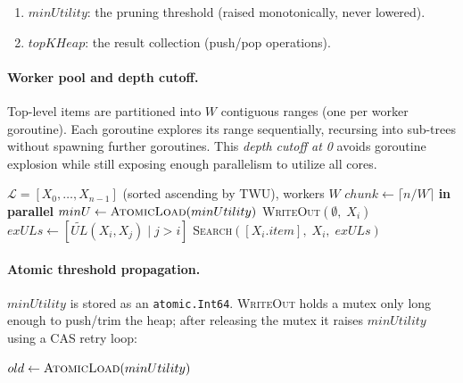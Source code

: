 \begin{enumerate}
  \item $minUtility$: the pruning threshold (raised monotonically, never lowered).
  \item $topKHeap$: the result collection (push/pop operations).
\end{enumerate}

\paragraph{Worker pool and depth cutoff.}
Top-level items are partitioned into $W$ contiguous ranges (one per worker goroutine).
Each goroutine explores its range sequentially, recursing into sub-trees without spawning
further goroutines.
This \emph{depth cutoff at 0} avoids goroutine explosion while still exposing enough
parallelism to utilize all cores.

\begin{algorithm}[H]
\caption{PTKO: Top-Level Fork/Join with Atomic Threshold}
\begin{algorithmic}[1]
\Require $\mathcal{L} = [X_0, \ldots, X_{n-1}]$ (sorted ascending by TWU), workers $W$
\State $chunk \leftarrow \lceil n / W \rceil$
 \textbf{in parallel} 
        \State $minU \leftarrow \textsc{AtomicLoad}(minUtility)$
            \State \textsc{WriteOut}$(\emptyset,\; X_i)$ 
        \EndIf
            \State $exULs \leftarrow [\widetilde{UL}(X_i, X_j) \mid j > i]$
            \State \textsc{Search}$([X_i.item],\; X_i,\; exULs)$ 
        \EndIf
    \EndFor
\EndFor {}
\end{algorithmic}
\end{algorithm}

\paragraph{Atomic threshold propagation.}
$minUtility$ is stored as an \texttt{atomic.Int64}.
\textsc{WriteOut} holds a mutex only long enough to push/trim the heap;
after releasing the mutex it raises $minUtility$ using a CAS retry loop:

\begin{algorithm}[H]
\caption{CAS Raise of Atomic $minUtility$}
\begin{algorithmic}[1]
\Repeat
    \State $old \leftarrow \textsc{AtomicLoad}(minUtility)$
     \Return \EndIf
{}
\EndProcedure
\end{algorithmic}
\end{algorithm}

